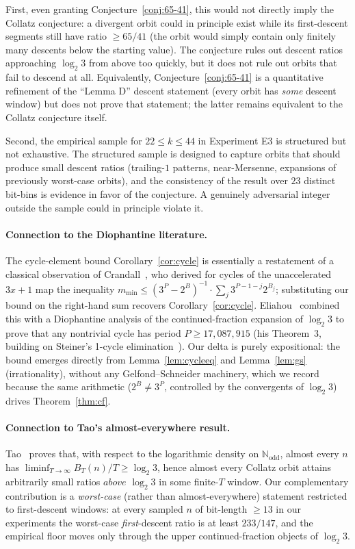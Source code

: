 \documentclass[11pt,a4paper]{article}
\theoremstyle{definition}
\theoremstyle{remark}
\newcommand{\N}{\mathbb{N}}
\newcommand{\Nodd}{\N_{\mathrm{odd}}}
\begin{document}
First, even granting Conjecture~\ref{conj:65-41}, this would not
directly imply the Collatz conjecture: a divergent orbit could in
principle exist while its first-descent segments still have
ratio $\geq 65/41$ (the orbit would simply contain only finitely
many descents below the starting value).  The conjecture rules out
descent ratios approaching $\log_2 3$ from above too quickly, but it
does not rule out orbits that fail to descend at all.  Equivalently,
Conjecture~\ref{conj:65-41} is a quantitative refinement of the
``Lemma D'' descent statement (every orbit has \emph{some} descent
window) but does not prove that statement; the latter remains
equivalent to the Collatz conjecture itself.

Second, the empirical sample for $22 \leq k \leq 44$ in Experiment
E3 is structured but not exhaustive.  The structured sample is
designed to capture orbits that should produce small descent ratios
(trailing-$1$ patterns, near-Mersenne, expansions of previously
worst-case orbits), and the consistency of the result over $23$
distinct bit-bins is evidence in favor of the conjecture.  A
genuinely adversarial integer outside the sample could in principle
violate it.

\paragraph{Connection to the Diophantine literature.}
The cycle-element bound Corollary~\ref{cor:cycle} is essentially a
restatement of a classical observation of Crandall~\cite[Eq.~(8),
p.~1284]{Crandall1978}, who derived for cycles of the unaccelerated
$3x+1$ map the inequality $m_{\min} \leq (3^P - 2^B)^{-1} \cdot
\sum_j 3^{P-1-j} 2^{B_j}$; substituting our bound on the right-hand
sum recovers Corollary~\ref{cor:cycle}.  Eliahou~\cite{Eliahou1993}
combined this with a Diophantine analysis of the continued-fraction
expansion of $\log_2 3$ to prove that any nontrivial cycle has
period $P \geq 17{,}087{,}915$ (his Theorem~3, building on Steiner's
1-cycle elimination~\cite{Steiner1977}).  Our delta is purely
expositional: the bound emerges directly from Lemma~\ref{lem:cycleeq}
and Lemma~\ref{lem:gs} (irrationality), without any
Gelfond--Schneider machinery, which we record because the same
arithmetic ($2^B \neq 3^P$, controlled by the convergents of
$\log_2 3$) drives Theorem~\ref{thm:cf}.

\paragraph{Connection to Tao's almost-everywhere result.}
Tao~\cite{Tao2022} proves that, with respect to the logarithmic
density on $\Nodd$, almost every $n$ has $\liminf_{T \to \infty}
B_T(n)/T \geq \log_2 3$, hence almost every Collatz orbit attains
arbitrarily small ratios $\textit{above}$ $\log_2 3$ in some
finite-$T$ window.  Our complementary contribution is a
\emph{worst-case} (rather than almost-everywhere) statement
restricted to first-descent windows: at every sampled $n$ of
bit-length $\geq 13$ in our experiments the worst-case
\emph{first}-descent ratio is at least $233/147$, and the empirical
floor moves only through the upper continued-fraction objects of
$\log_2 3$.
\end{document}

